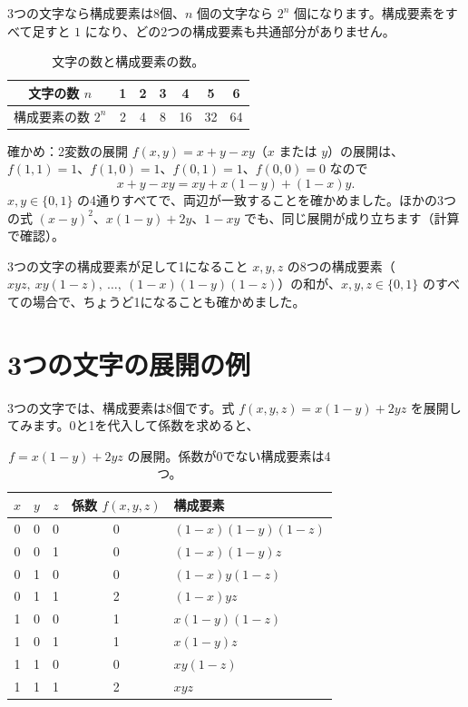 \documentclass[a4paper,11pt,openany]{ltjsbook}
\begin{document}
3つの文字なら構成要素は8個、$n$ 個の文字なら $2^n$ 個になります。構成要素をすべて足すと $1$ になり、どの2つの構成要素も共通部分がありません。

\begin{table}[htbp]
\centering
\begin{tabular}{c|cccccc}
\toprule
文字の数 $n$ & 1 & 2 & 3 & 4 & 5 & 6\\
\midrule
構成要素の数 $2^n$ & 2 & 4 & 8 & 16 & 32 & 64\\
\bottomrule
\end{tabular}
\caption{文字の数と構成要素の数。}
\end{table}

\begin{examplebox}{確かめ：2変数の展開}
$f(x,y)=x+y-xy$（$x$ または $y$）の展開は、$f(1,1)=1$、$f(1,0)=1$、$f(0,1)=1$、$f(0,0)=0$ なので
\[
x+y-xy=xy+x(1-y)+(1-x)y .
\]
$x,y\in\{0,1\}$ の4通りすべてで、両辺が一致することを確かめました。ほかの3つの式 $(x-y)^2$、$x(1-y)+2y$、$1-xy$ でも、同じ展開が成り立ちます（計算で確認）。
\end{examplebox}

\begin{notebox}{3つの文字の構成要素が足して1になること}
$x,y,z$ の8つの構成要素（$xyz,\ xy(1-z),\ \ldots,\ (1-x)(1-y)(1-z)$）の和が、$x,y,z\in\{0,1\}$ のすべての場合で、ちょうど1になることも確かめました。
\end{notebox}

\section{3つの文字の展開の例}

3つの文字では、構成要素は8個です。式 $f(x,y,z)=x(1-y)+2yz$ を展開してみます。0と1を代入して係数を求めると、

\begin{table}[htbp]
\centering
\begin{tabular}{ccc|c|l}
\toprule
$x$ & $y$ & $z$ & 係数 $f(x,y,z)$ & 構成要素\\
\midrule
0 & 0 & 0 & 0 & $(1-x)(1-y)(1-z)$\\
0 & 0 & 1 & 0 & $(1-x)(1-y)z$\\
0 & 1 & 0 & 0 & $(1-x)y(1-z)$\\
0 & 1 & 1 & 2 & $(1-x)yz$\\
1 & 0 & 0 & 1 & $x(1-y)(1-z)$\\
1 & 0 & 1 & 1 & $x(1-y)z$\\
1 & 1 & 0 & 0 & $xy(1-z)$\\
1 & 1 & 1 & 2 & $xyz$\\
\bottomrule
\end{tabular}
\caption{$f=x(1-y)+2yz$ の展開。係数が0でない構成要素は4つ。}
\end{table}
\end{document}
